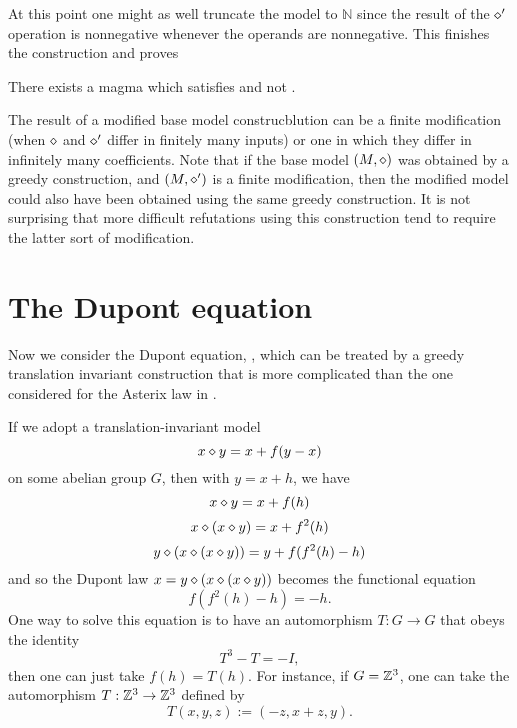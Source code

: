 At this point one might as well truncate the model to $\mathbb{N}$ since the result of the $\diamond'$
operation is nonnegative whenever the operands are nonnegative. This finishes the construction and proves

\begin{theorem}\label{non_imp_1659_4315_thm}
  \leanok
  There exists a magma which satisfies  and not .
\end{theorem}

The result of a modified base model construcblution can be a finite modification (when $\diamond$ and $\diamond'$
differ in finitely many inputs) or one in which they differ in infinitely many coefficients. Note that if the base
model $(M,\diamond)$ was obtained by a greedy construction, and $(M,\diamond')$ is a finite modification, then the
modified model could also have been obtained using the same greedy construction. It is not surprising that
more difficult refutations using this construction tend to require the latter sort of modification.


\section{The Dupont equation}\label{dupont-section}

Now we consider the Dupont equation, , which can be treated by a greedy translation invariant construction that is more complicated than the one considered for the Asterix law in .

If we adopt a translation-invariant model
$$ x \diamond y = x + f(y-x)$$
on some abelian group $G$, then with $y = x+h$, we have
$$ x \diamond y = x + f(h)$$
$$ x \diamond (x \diamond y) = x + f^2(h)$$
$$ y \diamond (x \diamond (x \diamond y)) = y + f(f^2(h)-h)$$
and so the Dupont law $x = y \diamond (x \diamond (x \diamond y))$ becomes the functional equation
\begin{equation}\label{dupont-eq}
  f(f^2(h)-h) = -h.
\end{equation}
One way to solve this equation is to have an automorphism $T: G \to G$ that obeys the identity
$$ T^3 - T = -I,$$
then one can just take $f(h) = T(h)$.  For instance, if $G = \mathbb{Z}^3$, one can take the automorphism $T: \mathbb{Z}^3 \to \mathbb{Z}^3$ defined by
$$ T(x,y,z) := (-z,x+z,y).$$

